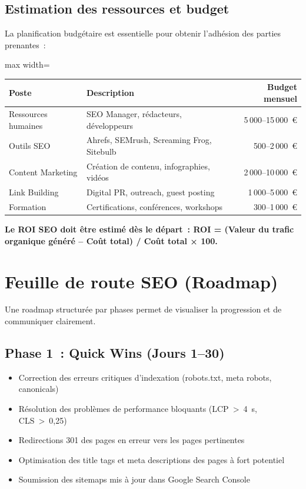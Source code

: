 \documentclass[12pt,a4paper,twoside]{report}
\newcommand{\important}[1]{\textbf{\textcolor{googlered}{#1}}}
\begin{document}
\subsection{Estimation des ressources et budget}

La planification budgétaire est essentielle pour obtenir l'adhésion des parties prenantes~:

\begin{adjustbox}{max width=\textwidth}
\begin{tabular}{llr}
\toprule
\textbf{Poste} & \textbf{Description} & \textbf{Budget mensuel} \\
\midrule
Ressources humaines & SEO Manager, rédacteurs, développeurs & 5\,000--15\,000~€ \\
Outils SEO & Ahrefs, SEMrush, Screaming Frog, Sitebulb & 500--2\,000~€ \\
Content Marketing & Création de contenu, infographies, vidéos & 2\,000--10\,000~€ \\
Link Building & Digital PR, outreach, guest posting & 1\,000--5\,000~€ \\
Formation & Certifications, conférences, workshops & 300--1\,000~€ \\
\bottomrule
\end{tabular}
\end{adjustbox}

\important{Le ROI SEO doit être estimé dès le départ~: ROI = (Valeur du trafic organique généré -- Coût total) / Coût total × 100.}

\section{Feuille de route SEO (Roadmap)}

Une roadmap structurée par phases permet de visualiser la progression et de communiquer clairement.

\subsection{Phase 1~: Quick Wins (Jours 1--30)}

\begin{itemize}
    \item Correction des erreurs critiques d'indexation (robots.txt, meta robots, canonicals)
    \item Résolution des problèmes de performance bloquants (LCP~>~4~s, CLS~>~0,25)
    \item Redirections 301 des pages en erreur vers les pages pertinentes
    \item Optimisation des title tags et meta descriptions des pages à fort potentiel
    \item Soumission des sitemaps mis à jour dans Google Search Console
\end{itemize}
\end{document}
